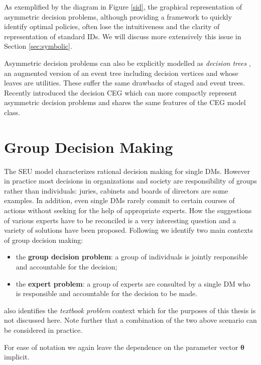 As exemplified by the diagram in Figure \ref{sid}, the graphical representation of asymmetric decision problems, although providing a framework to quickly identify optimal policies, often lose the intuitiveness and the clarity of representation of standard \glspl{ID}. We will discuss more extensively this issue in Section \ref{sec:symbolic}.
 
Asymmetric decision problems can also be explicitly modelled as \textit{decision trees} \citep[see e.g.][]{Clemen1996a,French2009}, an augmented version of an event tree including decision vertices and whose leaves are utilities. These suffer the same drawbacks of staged and event trees. Recently \citet{Cowell2010} introduced the decision \gls{CEG} which can more compactly represent asymmetric decision problems and shares the same features of the \gls{CEG} model class.
 
\section{Group Decision Making}
\label{sec:group}
The \gls{SEU} model characterizes rational decision making for single \glspl{DM}. However in practice most decisions in organizations and society are responsibility of groups rather than individuals: juries, cabinets and boards of directors are some examples. In addition, even single \glspl{DM} rarely commit to certain courses of actions without seeking for the help of appropriate experts. How the suggestions of various experts have to be reconciled is a very interesting question and a variety of solutions have been proposed. Following \citet{French2011} we identify two main contexts of group decision making:
\begin{itemize}
\item the \textbf{group decision problem}: a group of individuals is jointly responsible and accountable for the decision;
\item the \textbf{expert problem}: a group of experts are consulted by a single \gls{DM} who is responsible and accountable for the decision to be made.
\end{itemize}
\citet{French2011} also identifies the \textit{textbook problem} context which for the purposes of this thesis is not discussed here. Note further that a combination of the two above scenario can be considered in practice.

For ease of notation we again leave the dependence on the parameter vector $\bm{\theta}$ implicit. 
 
